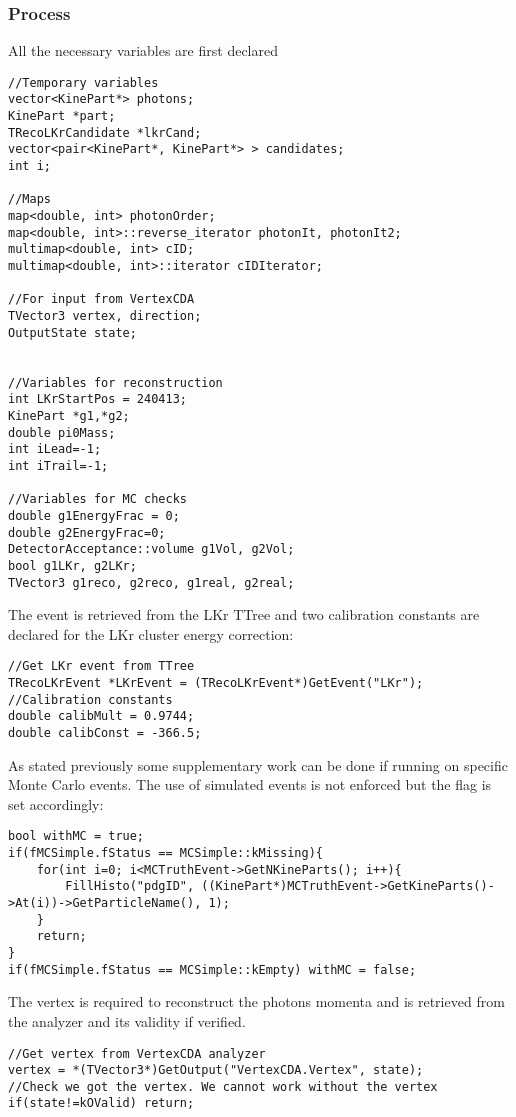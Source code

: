 \subsubsection{Process}
All the necessary variables are first declared
\begin{lstlisting}
//Temporary variables
vector<KinePart*> photons;
KinePart *part;
TRecoLKrCandidate *lkrCand;
vector<pair<KinePart*, KinePart*> > candidates;
int i;

//Maps
map<double, int> photonOrder;
map<double, int>::reverse_iterator photonIt, photonIt2;
multimap<double, int> cID;
multimap<double, int>::iterator cIDIterator;

//For input from VertexCDA
TVector3 vertex, direction;
OutputState state;


//Variables for reconstruction
int LKrStartPos = 240413;
KinePart *g1,*g2;
double pi0Mass;
int iLead=-1;
int iTrail=-1;

//Variables for MC checks
double g1EnergyFrac = 0;
double g2EnergyFrac=0;
DetectorAcceptance::volume g1Vol, g2Vol;
bool g1LKr, g2LKr;
TVector3 g1reco, g2reco, g1real, g2real;
\end{lstlisting}

The event is retrieved from the LKr TTree and two calibration constants are declared for the LKr
cluster energy correction:
\begin{lstlisting}
//Get LKr event from TTree
TRecoLKrEvent *LKrEvent = (TRecoLKrEvent*)GetEvent("LKr");
//Calibration constants
double calibMult = 0.9744;
double calibConst = -366.5;
\end{lstlisting}

As stated previously some supplementary work can be done if running on specific Monte Carlo events.
The use of simulated events is not enforced but the  flag is set accordingly:
\begin{lstlisting}
bool withMC = true;
if(fMCSimple.fStatus == MCSimple::kMissing){
	for(int i=0; i<MCTruthEvent->GetNKineParts(); i++){
		FillHisto("pdgID", ((KinePart*)MCTruthEvent->GetKineParts()->At(i))->GetParticleName(), 1);
	}
	return;
}
if(fMCSimple.fStatus == MCSimple::kEmpty) withMC = false;
\end{lstlisting}

The vertex is required to reconstruct the photons momenta and is retrieved from the
 analyzer and its validity if verified.
\begin{lstlisting}
//Get vertex from VertexCDA analyzer
vertex = *(TVector3*)GetOutput("VertexCDA.Vertex", state);
//Check we got the vertex. We cannot work without the vertex
if(state!=kOValid) return;
\end{lstlisting}

